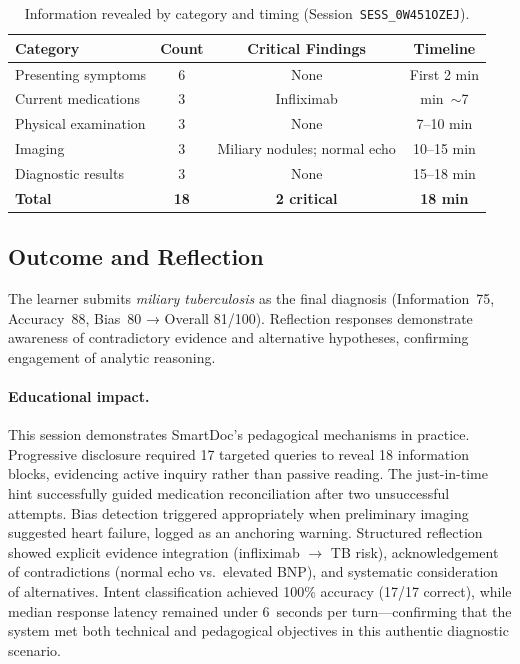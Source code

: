 \begin{table}[h]
\centering
\caption{Information revealed by category and timing (Session~\texttt{SESS\_0W451OZEJ}).}
\label{tab:discoveries_mtb}
\begin{tabular}{lccc}
\toprule
\textbf{Category} & \textbf{Count} & \textbf{Critical Findings} & \textbf{Timeline} \\
\midrule
Presenting symptoms & 6 & None & First 2 min \\
Current medications & 3 & Infliximab & min~\(\sim\)7 \\
Physical examination & 3 & None & 7--10 min \\
Imaging & 3 & Miliary nodules; normal echo & 10--15 min \\
Diagnostic results & 3 & None & 15--18 min \\
\midrule
\textbf{Total} & \textbf{18} & \textbf{2 critical} & \textbf{18 min} \\
\bottomrule
\end{tabular}
\end{table}

\subsection{Outcome and Reflection}

The learner submits \emph{miliary tuberculosis} as the final diagnosis
(Information~75, Accuracy~88, Bias~80 → Overall 81/100).
Reflection responses demonstrate awareness of contradictory evidence and
alternative hypotheses, confirming engagement of analytic reasoning.

\paragraph{Educational impact.}
This session demonstrates SmartDoc's pedagogical mechanisms in practice.
Progressive disclosure required 17 targeted queries to reveal 18 information
blocks, evidencing active inquiry rather than passive reading.
The just-in-time hint successfully guided medication reconciliation after two
unsuccessful attempts.
Bias detection triggered appropriately when preliminary imaging suggested heart
failure, logged as an anchoring warning.
Structured reflection showed explicit evidence integration (infliximab
$\rightarrow$ TB risk), acknowledgement of contradictions (normal echo vs.\
elevated BNP), and systematic consideration of alternatives.
Intent classification achieved 100\% accuracy (17/17 correct), while median
response latency remained under 6~seconds per turn—confirming that the system
met both technical and pedagogical objectives in this authentic diagnostic
scenario.

